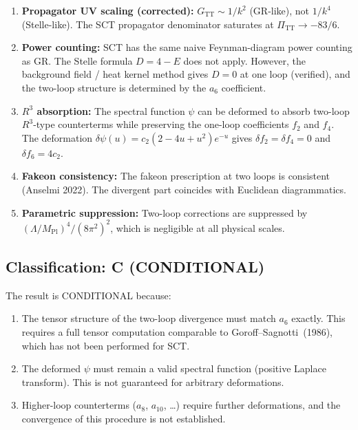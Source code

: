 \documentclass[12pt,a4paper]{article}
\begin{document}
\begin{enumerate}
  \item \textbf{Propagator UV scaling (corrected):} $G_{\mathrm{TT}} \sim 1/k^2$
    (GR-like), not $1/k^4$ (Stelle-like). The SCT propagator denominator
    saturates at $\Pi_{\mathrm{TT}} \to -83/6$.

  \item \textbf{Power counting:} SCT has the same naive Feynman-diagram
    power counting as GR. The Stelle formula $D = 4 - E$ does not apply.
    However, the background field / heat kernel method gives $D = 0$ at
    one loop (verified), and the two-loop structure is determined by the
    $a_6$ coefficient.

  \item \textbf{$R^3$ absorption:} The spectral function $\psi$ can be
    deformed to absorb two-loop $R^3$-type counterterms while preserving
    the one-loop coefficients $f_2$ and $f_4$. The deformation
    $\delta\psi(u) = c_2(2 - 4u + u^2)e^{-u}$ gives
    $\delta f_2 = \delta f_4 = 0$ and $\delta f_6 = 4c_2$.

  \item \textbf{Fakeon consistency:} The fakeon prescription at two loops
    is consistent (Anselmi 2022). The divergent part coincides with
    Euclidean diagrammatics.

  \item \textbf{Parametric suppression:} Two-loop corrections are
    suppressed by $(\Lambda/M_{\text{Pl}})^4/(8\pi^2)^2$, which is
    negligible at all physical scales.
\end{enumerate}

\subsection{Classification: C (CONDITIONAL)}

The result is CONDITIONAL because:
\begin{enumerate}
  \item The tensor structure of the two-loop divergence must match $a_6$
    exactly. This requires a full tensor computation comparable to
    Goroff--Sagnotti~(1986), which has not been performed for SCT.
  \item The deformed $\psi$ must remain a valid spectral function
    (positive Laplace transform). This is not guaranteed for arbitrary
    deformations.
  \item Higher-loop counterterms ($a_8$, $a_{10}$, \ldots) require further
    deformations, and the convergence of this procedure is not established.
\end{enumerate}
\end{document}
